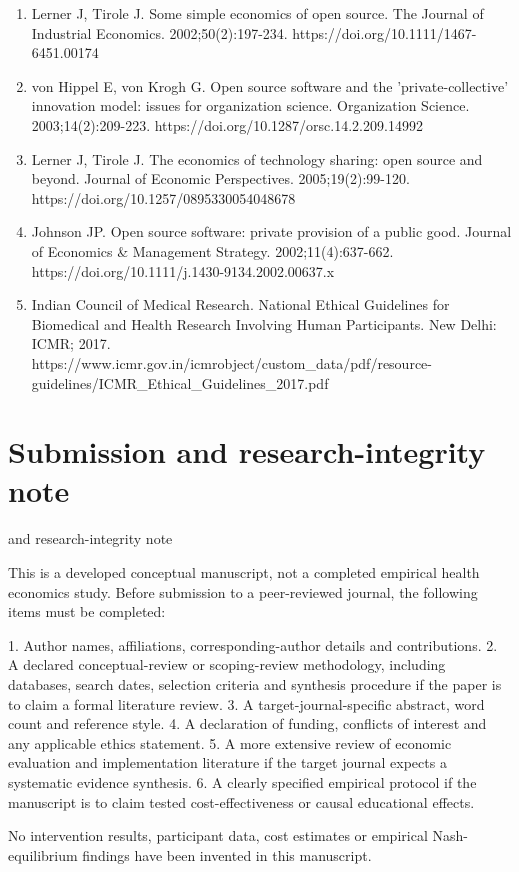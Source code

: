 \documentclass[11pt,a4paper]{article}
\begin{document}
\begin{enumerate}[leftmargin=*]
\item Lerner J, Tirole J. Some simple economics of open source. The Journal of Industrial Economics. 2002;50(2):197-234. https://doi.org/10.1111/1467-6451.00174
\item von Hippel E, von Krogh G. Open source software and the 'private-collective' innovation model: issues for organization science. Organization Science. 2003;14(2):209-223. https://doi.org/10.1287/orsc.14.2.209.14992
\item Lerner J, Tirole J. The economics of technology sharing: open source and beyond. Journal of Economic Perspectives. 2005;19(2):99-120. https://doi.org/10.1257/0895330054048678
\item Johnson JP. Open source software: private provision of a public good. Journal of Economics \& Management Strategy. 2002;11(4):637-662. https://doi.org/10.1111/j.1430-9134.2002.00637.x
\item Indian Council of Medical Research. National Ethical Guidelines for Biomedical and Health Research Involving Human Participants. New Delhi: ICMR; 2017. https://www.icmr.gov.in/icmrobject/custom\_data/pdf/resource-guidelines/ICMR\_Ethical\_Guidelines\_2017.pdf
\end{enumerate}\n\section*{Submission and research-integrity note}\nSubmission and research-integrity note

This is a developed conceptual manuscript, not a completed empirical health economics study. Before submission to a peer-reviewed journal, the following items must be completed:

1. Author names, affiliations, corresponding-author details and contributions.
2. A declared conceptual-review or scoping-review methodology, including databases, search dates, selection criteria and synthesis procedure if the paper is to claim a formal literature review.
3. A target-journal-specific abstract, word count and reference style.
4. A declaration of funding, conflicts of interest and any applicable ethics statement.
5. A more extensive review of economic evaluation and implementation literature if the target journal expects a systematic evidence synthesis.
6. A clearly specified empirical protocol if the manuscript is to claim tested cost-effectiveness or causal educational effects.

No intervention results, participant data, cost estimates or empirical Nash-equilibrium findings have been invented in this manuscript.
\end{document}
